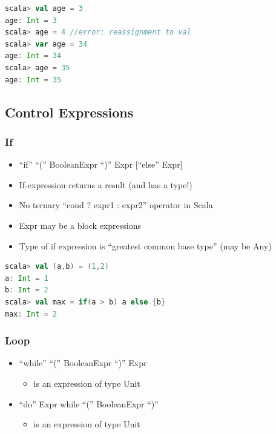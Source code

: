 \begin{lstlisting}[language=scala]
scala> val age = 3
age: Int = 3
scala> age = 4 //error: reassignment to val
scala> var age = 34
age: Int = 34
scala> age = 35
age: Int = 35
\end{lstlisting}

\hypertarget{control-expressions}{%
\subsection{Control Expressions}\label{control-expressions}}

\hypertarget{if}{%
\subsubsection{If}\label{if}}

\begin{itemize}
\tightlist
\item
  ``if'' ``('' BooleanExpr ``)'' Expr {[}``else'' Expr{]}
\item
  If-expression returns a result (and has a type!)
\item
  No ternary ``cond ? expr1 : expr2'' operator in Scala
\item
  Expr may be a block expressions
\item
  Type of if expression is ``greatest common base type'' (may be Any)
\end{itemize}

\begin{lstlisting}[language=scala]
scala> val (a,b) = (1,2)
a: Int = 1
b: Int = 2
scala> val max = if(a > b) a else {b}
max: Int = 2
\end{lstlisting}

\hypertarget{loop}{%
\subsubsection{Loop}\label{loop}}

\begin{itemize}
\tightlist
\item
  ``while'' ``('' BooleanExpr ``)'' Expr

  \begin{itemize}
  \tightlist
  \item
    is an expression of type Unit
  \end{itemize}
\item
  ``do'' Expr while ``('' BooleanExpr ``)''

  \begin{itemize}
  \tightlist
  \item
    is an expression of type Unit
  \end{itemize}
\end{itemize}

